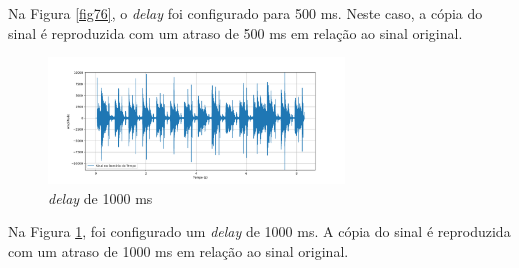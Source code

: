 Na Figura \ref{fig76}, o \textit{delay} foi configurado para 500 ms. Neste caso, a cópia do sinal é reproduzida com um atraso de 500 ms em relação ao sinal original.

\newpage
\begin{figure}[h]
	\centering
    \includegraphics[width=0.7\textwidth]{figuras/fig77.png}
	\caption{\textit{delay} de 1000 ms}
	\label{fig77}
\end{figure}

Na Figura \ref{fig77}, foi configurado um \textit{delay} de 1000 ms. A cópia do sinal é reproduzida com um atraso de 1000 ms em relação ao sinal original.